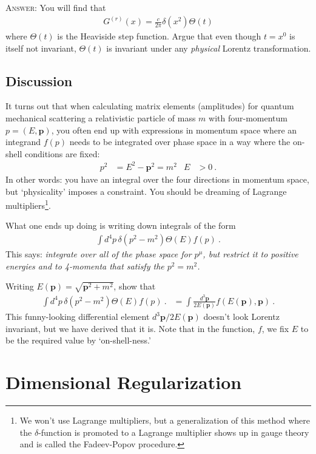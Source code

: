 \documentclass[12pt]{article}
\numberwithin{equation}{section}    %
\renewcommand{\vec}[1]{\mathbf{#1}} %
\begin{document}
\textsc{Answer}: You will find that 
\begin{align}
	G^{(r)}(x) = \frac{c}{2\pi} \delta(x^2) \Theta(t)
\end{align}
where $\Theta(t)$ is the Heaviside step function. Argue that even though $t=x^0$ is itself not invariant, $\Theta(t)$ is invariant under any \emph{physical} Lorentz transformation. 


\subsection{Discussion}
It turns out that when calculating matrix elements (amplitudes) for quantum mechanical scattering a relativistic particle of mass $m$ with four-momentum $p = (E,\vec p)$, you often end up with expressions in momentum space where an integrand $f(p)$ needs to be integrated over phase space in a way where the on-shell conditions are fixed:
\begin{align}
	p^2 &= E^2 - \vec p^2 = m^2 
	&
	E &>0
	\ .
\end{align}
In other words: you have an integral over the four directions in momentum space, but `physicality' imposes a constraint. You should be dreaming of Lagrange multipliers\footnote{We won't use Lagrange multipliers, but a generalization of this method where the $\delta$-function is promoted to a Lagrange multiplier shows up in gauge theory and is called the Fadeev-Popov procedure.}. 

What one ends up doing is writing down integrals of the form
\begin{align}
	\int d^4p \, \delta(p^2 - m^2) \Theta(E) f(p) \ .
\end{align}
This says: \emph{integrate over all of the phase space for $p^\mu$, but restrict it to positive energies and to 4-momenta that satisfy the $p^2=m^2$.}

Writing $E(\vec p) = \sqrt{\vec p^2 +m^2}$, show that
\begin{align}
	\int d^4p \, \delta(p^2 - m^2) \Theta(E) f(p) \ .
	& = 
	\int \frac{d^3\vec p}{2E(\vec p)} f(E(\vec p), \vec p) \ .
\end{align}
This funny-looking differential element $d^3\vec p/2E(\vec p)$ doesn't look Lorentz invariant, but we have derived that it is. Note that in the function, $f$, we fix $E$ to be the required value by `on-shell-ness.'




\section{Dimensional Regularization}
\end{document}

